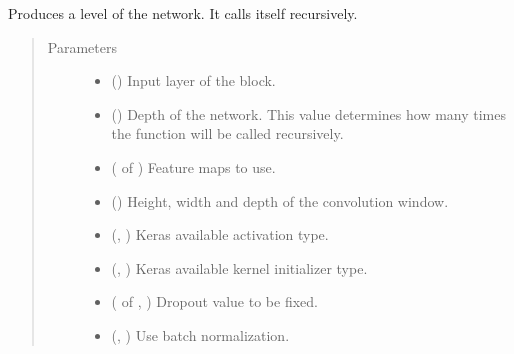 \documentclass[letterpaper,10pt,english]{sphinxmanual}
\begin{document}
\begin{fulllineitems}
\label{\detokenize{models/resunet_3d:models.resunet_3d.level_block}}
Produces a level of the network. It calls itself recursively.
\begin{quote}\begin{description}
\item[{Parameters}] \leavevmode\begin{itemize}
\item {} 
 () \textendash{} Input layer of the block.

\item {} 
 () \textendash{} Depth of the network. This value determines how many times the function will be called recursively.

\item {} 
 ( of ) \textendash{} Feature maps to use.

\item {} 
 () \textendash{} Height, width and depth of the convolution window.

\item {} 
 (, ) \textendash{} Keras available activation type.

\item {} 
 (, ) \textendash{} Keras available kernel initializer type.

\item {} 
 ( of , ) \textendash{} Dropout value to be fixed.

\item {} 
 (, ) \textendash{} Use batch normalization.


\end{itemize}
\end{description}
\end{quote}
\end{fulllineitems}
\end{document}
